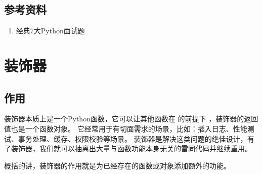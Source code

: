 \documentclass[letterpaper,10pt,english]{sphinxmanual}
\begin{document}
\subsection{参考资料}
\label{\detokenize{python/03_is:id2}}\begin{enumerate}
\item {} 
经典7大Python面试题

\end{enumerate}
\begin{quote}

\end{quote}


\section{装饰器}
\label{\detokenize{python/04_decorator::doc}}\label{\detokenize{python/04_decorator:id1}}

\subsection{作用}
\label{\detokenize{python/04_decorator:id2}}
装饰器本质上是一个Python函数，它可以让其他函数在  的前提下  ，装饰器的返回值也是一个函数对象。
它经常用于有切面需求的场景，比如：插入日志、性能测试、事务处理、缓存、权限校验等场景。
装饰器是解决这类问题的绝佳设计，有了装饰器，我们就可以抽离出大量与函数功能本身无关的雷同代码并继续重用。

概括的讲，装饰器的作用就是为已经存在的函数或对象添加额外的功能。
\end{document}
